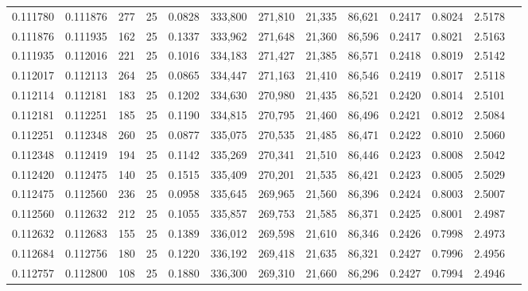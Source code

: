 \begin{tabular}{rrrrrrrrrrrrr}
0.111780 & 0.111876 &   277 &  25 &                                     0.0828 & 333,800 & 271,810 &  21,335 &  86,621 & 0.2417 & 0.8024 & 2.5178 \\
0.111876 & 0.111935 &   162 &  25 &                                     0.1337 & 333,962 & 271,648 &  21,360 &  86,596 & 0.2417 & 0.8021 & 2.5163 \\
0.111935 & 0.112016 &   221 &  25 &                                     0.1016 & 334,183 & 271,427 &  21,385 &  86,571 & 0.2418 & 0.8019 & 2.5142 \\
0.112017 & 0.112113 &   264 &  25 &                                     0.0865 & 334,447 & 271,163 &  21,410 &  86,546 & 0.2419 & 0.8017 & 2.5118 \\
0.112114 & 0.112181 &   183 &  25 &                                     0.1202 & 334,630 & 270,980 &  21,435 &  86,521 & 0.2420 & 0.8014 & 2.5101 \\
0.112181 & 0.112251 &   185 &  25 &                                     0.1190 & 334,815 & 270,795 &  21,460 &  86,496 & 0.2421 & 0.8012 & 2.5084 \\
0.112251 & 0.112348 &   260 &  25 &                                     0.0877 & 335,075 & 270,535 &  21,485 &  86,471 & 0.2422 & 0.8010 & 2.5060 \\
0.112348 & 0.112419 &   194 &  25 &                                     0.1142 & 335,269 & 270,341 &  21,510 &  86,446 & 0.2423 & 0.8008 & 2.5042 \\
0.112420 & 0.112475 &   140 &  25 &                                     0.1515 & 335,409 & 270,201 &  21,535 &  86,421 & 0.2423 & 0.8005 & 2.5029 \\
0.112475 & 0.112560 &   236 &  25 &                                     0.0958 & 335,645 & 269,965 &  21,560 &  86,396 & 0.2424 & 0.8003 & 2.5007 \\
0.112560 & 0.112632 &   212 &  25 &                                     0.1055 & 335,857 & 269,753 &  21,585 &  86,371 & 0.2425 & 0.8001 & 2.4987 \\
0.112632 & 0.112683 &   155 &  25 &                                     0.1389 & 336,012 & 269,598 &  21,610 &  86,346 & 0.2426 & 0.7998 & 2.4973 \\
0.112684 & 0.112756 &   180 &  25 &                                     0.1220 & 336,192 & 269,418 &  21,635 &  86,321 & 0.2427 & 0.7996 & 2.4956 \\
0.112757 & 0.112800 &   108 &  25 &                                     0.1880 & 336,300 & 269,310 &  21,660 &  86,296 & 0.2427 & 0.7994 & 2.4946 \\

\end{tabular}
